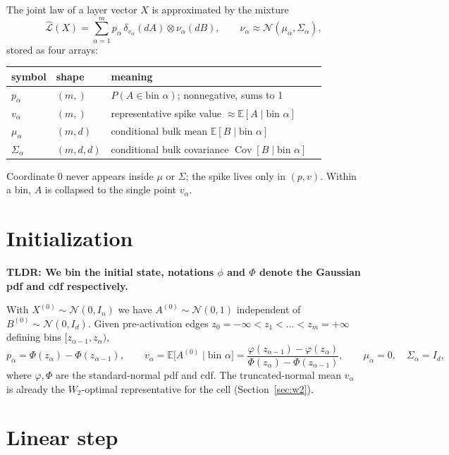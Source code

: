 \documentclass[11pt]{article}
\newcommand{\E}{\mathbb{E}}
\newcommand{\Cov}{\operatorname{Cov}}
\newcommand{\law}{\mathcal{L}}
\newcommand{\N}{\mathcal{N}}
\begin{document}
The joint law of a layer vector $X$ is approximated by the mixture
\begin{equation}
\widehat{\law}(X) = \sum_{\alpha=1}^{m} p_\alpha\, \delta_{v_\alpha}(dA) \otimes \nu_\alpha(dB),
\qquad \nu_\alpha \approx \N(\mu_\alpha, \Sigma_\alpha),
\label{eq:state}
\end{equation}
stored as four arrays:
\begin{center}
\begin{tabular}{llll}
\toprule
symbol & shape & meaning \\
\midrule
$p_\alpha$ & $(m,)$ & $P(A \in \text{bin } \alpha)$; nonnegative, sums to 1 \\
$v_\alpha$ & $(m,)$ & representative spike value $\approx \E[A \mid \text{bin }\alpha]$ \\
$\mu_\alpha$ & $(m, d)$ & conditional bulk mean $\E[B \mid \text{bin }\alpha]$ \\
$\Sigma_\alpha$ & $(m, d, d)$ & conditional bulk covariance $\Cov[B \mid \text{bin }\alpha]$ \\
\bottomrule
\end{tabular}
\end{center}
Coordinate $0$ never appears inside $\mu$ or $\Sigma$; the spike lives only in $(p, v)$. Within a bin, $A$ is collapsed to the single point $v_\alpha$. 

\section{Initialization}

\textbf{TLDR: We bin the initial state, notations $\phi$ and $\Phi$ denote the Gaussian pdf and cdf respectively.}

With $X^{(0)} \sim \N(0, I_n)$ we have $A^{(0)} \sim \N(0,1)$ independent of $B^{(0)} \sim \N(0, I_d)$. Given pre-activation edges $z_0 = -\infty < z_1 < \dots < z_m = +\infty$ defining bins $[z_{\alpha-1}, z_\alpha)$,
\begin{equation}
p_\alpha = \Phi(z_\alpha) - \Phi(z_{\alpha-1}), \qquad
v_\alpha = \E\big[A^{(0)} \mid \text{bin } \alpha\big]
= \frac{\varphi(z_{\alpha-1}) - \varphi(z_\alpha)}{\Phi(z_\alpha) - \Phi(z_{\alpha-1})},
\qquad \mu_\alpha = 0,\quad \Sigma_\alpha = I_d,
\end{equation}
where $\varphi, \Phi$ are the standard-normal pdf and cdf. The truncated-normal mean $v_\alpha$ is already the $W_2$-optimal representative for the cell (Section~\ref{sec:w2}).

\section{Linear step}
\label{sec:linear}
\end{document}

